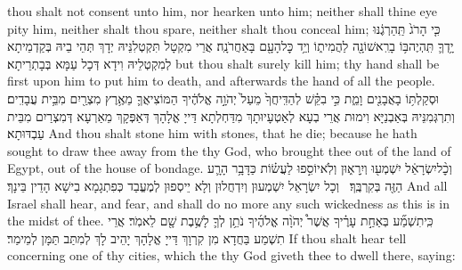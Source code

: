 {thou shalt not consent unto him, nor hearken unto him; neither shall thine eye pity him, neither shalt thou spare, neither shalt thou conceal him;}{}
{כִּ֤י הָרֹג֙ תַּֽהַרְגֶ֔נּוּ יָ֥דְךָ֛ תִּֽהְיֶה\maqqaf בּ֥וֹ בָרִֽאשׁוֹנָ֖ה לַהֲמִית֑וֹ וְיַ֥ד כׇּל\maqqaf הָעָ֖ם בָּאַחֲרֹנָֽה׃}
{אֲרֵי מִקְטָל תִּקְטְלִנֵּיהּ יְדָךְ תְּהֵי בֵיהּ בְּקַדְמֵיתָא לְמִקְטְלֵיהּ וִידָא דְּכָל עַמָּא בְּבָתְרֵיתָא׃}
{but thou shalt surely kill him; thy hand shall be first upon him to put him to death, and afterwards the hand of all the people.}{}
{וּסְקַלְתּ֥וֹ בָאֲבָנִ֖ים וָמֵ֑ת כִּ֣י בִקֵּ֗שׁ לְהַדִּֽיחֲךָ֙ מֵעַל֙ יְהֹוָ֣ה אֱלֹהֶ֔יךָ הַמּוֹצִיאֲךָ֛ מֵאֶ֥רֶץ מִצְרַ֖יִם מִבֵּ֥ית עֲבָדִֽים׃}
{וְתִרְגְּמִנֵּיהּ בְּאַבְנַיָּא וִימוּת אֲרֵי בְעָא לְאַטְעָיוּתָךְ מִדַּחְלְתָא דַּייָ אֱלָהָךְ דְּאַפְּקָךְ מֵאַרְעָא דְּמִצְרַיִם מִבֵּית עַבְדּוּתָא׃}
{And thou shalt stone him with stones, that he die; because he hath sought to draw thee away from the \lord\space thy God, who brought thee out of the land of Egypt, out of the house of bondage.}{}
{וְכׇ֨ל\maqqaf יִשְׂרָאֵ֔ל יִשְׁמְע֖וּ וְיִֽרָא֑וּן וְלֹֽא\maqqaf יוֹסִ֣פוּ לַעֲשׂ֗וֹת כַּדָּבָ֥ר הָרָ֛ע הַזֶּ֖ה בְּקִרְבֶּֽךָ׃ \setuma }
{וְכָל יִשְׂרָאֵל יִשְׁמְעוּן וְיִדְחֲלוּן וְלָא יֵיסְפוּן לְמֶעֱבַד כְּפִתְגָמָא בִישָׁא הָדֵין בֵּינָךְ׃}
{And all Israel shall hear, and fear, and shall do no more any such wickedness as this is in the midst of thee.}{}
{כִּֽי\maqqaf תִשְׁמַ֞ע בְּאַחַ֣ת עָרֶ֗יךָ אֲשֶׁר֩ יְהֹוָ֨ה אֱלֹהֶ֜יךָ נֹתֵ֥ן לְךָ֛ לָשֶׁ֥בֶת שָׁ֖ם לֵאמֹֽר׃}
{אֲרֵי תִשְׁמַע בַּחֲדָא מִן קִרְוָךְ דַּייָ אֱלָהָךְ יָהֵיב לָךְ לְמִתַּב תַּמָּן לְמֵימַר׃}
{If thou shalt hear tell concerning one of thy cities, which the \lord\space thy God giveth thee to dwell there, saying:}{}
